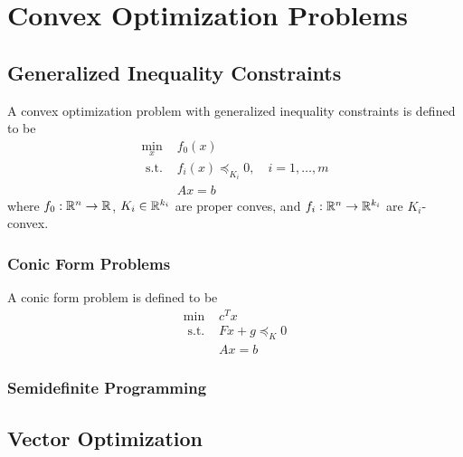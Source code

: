 \chapter{Convex Optimization Problems}

\section{Generalized Inequality Constraints}

\begin{definition}
	A convex optimization problem with generalized inequality constraints is defined to be
	\begin{equation}
		\begin{array}{ll}
			\min_x        & f_{0}(x)                                    \\
			\text{ s.t. } & f_{i}(x)\preceq_{K_{i}}0,\quad i=1,\ldots,m \\
			              & Ax=b
		\end{array}
	\end{equation}
	where \(f_{0}:\mathbb{R}^n\rightarrow\mathbb{R}\), \(K_i\in\mathbb{R}^{k_i}\) are proper conves, and \(f_i:\mathbb{R}^n\rightarrow\mathbb{R}^{k_i}\) are \(K_i\)-convex.
\end{definition}

\subsection{Conic Form Problems}

\begin{definition}
	A conic form problem is defined to be
	\begin{equation}
		\begin{array}{ll}
			\min          & c^{T}x           \\
			\text{ s.t. } & Fx+g\preceq_{K}0 \\
			              & Ax=b
		\end{array}
	\end{equation}
\end{definition}

\subsection{Semidefinite Programming}

\section{Vector Optimization}

